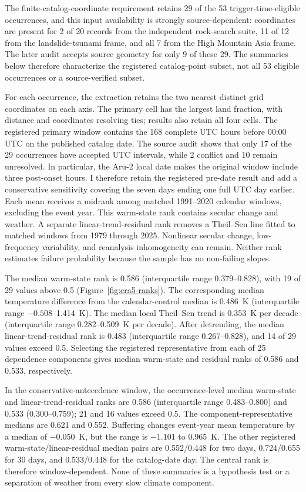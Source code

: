 \documentclass[11pt]{article}
\begin{document}
The finite-catalog-coordinate requirement retains 29 of the 53
trigger-time-eligible occurrences, and this input availability is strongly
source-dependent: coordinates are present for 2 of 20 records from the independent
rock-search suite, 11 of 12 from the landslide-tsunami frame, and all 7 from
the High Mountain Asia frame. The later audit accepts source geometry for only
9 of these 29. The summaries below therefore characterize the registered
catalog-point subset, not all 53 eligible occurrences or a source-verified
subset.

For each occurrence, the extraction retains the two nearest distinct grid
coordinates on each axis. The primary cell has the largest land fraction,
with distance and coordinates resolving ties; results also retain all four
cells. The registered primary window contains the 168 complete UTC hours
before 00:00 UTC on the published catalog date. The source audit shows that
only 17 of the 29 occurrences have accepted UTC intervals, while 2 conflict
and 10 remain unresolved. In particular, the Aru-2 local date
makes the original window include three post-onset hours. I therefore retain
the registered pre-date result and add a conservative sensitivity covering
the seven days ending one full UTC day earlier. Each mean receives a midrank
among matched 1991--2020 calendar windows, excluding the event year. This
warm-state rank contains secular change and weather. A separate
linear-trend-residual rank removes a Theil--Sen line fitted to matched windows
from 1979 through 2025. Nonlinear secular change, low-frequency variability,
and reanalysis inhomogeneity can remain. Neither rank estimates failure
probability because the sample has no non-failing slopes.

The median warm-state rank is 0.586 (interquartile range 0.379--0.828), with
19 of 29 values above 0.5 (Figure~\ref{fig:era5-ranks}). The corresponding
median temperature difference from the calendar-control median is 0.486~K
(interquartile range $-0.508$--1.414~K). The median local Theil--Sen trend is
0.353~K per decade (interquartile range 0.282--0.509~K per decade). After
detrending, the median linear-trend-residual rank is 0.483 (interquartile range
0.267--0.828), and 14 of 29 values exceed 0.5. Selecting the registered
representative from each of 25 dependence components gives median warm-state
and residual ranks of 0.586 and 0.533, respectively.

In the conservative-antecedence window, the occurrence-level median warm-state
and linear-trend-residual ranks are 0.586 (interquartile range 0.483--0.800)
and 0.533 (0.300--0.759); 21 and 16 values exceed 0.5. The
component-representative medians are 0.621 and 0.552. Buffering changes event-year mean
temperature by a median of $-0.050$~K, but the range is $-1.101$ to 0.965~K.
The other registered warm-state/linear-residual median pairs are 0.552/0.448
for two days, 0.724/0.655 for 30 days, and 0.533/0.448 for the catalog-date day.
The central rank is therefore window-dependent. None of these summaries is a
hypothesis test or a separation of weather from every slow climate component.
\end{document}
